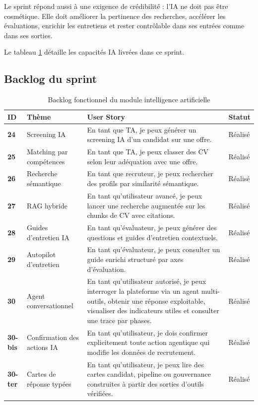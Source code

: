 Le sprint répond aussi à une exigence de crédibilité : l'IA ne doit pas être cosmétique. Elle doit améliorer la pertinence des recherches, accélérer les évaluations, enrichir les entretiens et rester contrôlable dans ses entrées comme dans ses sorties.

Le tableau \ref{tab:ai-backlog} détaille les capacités IA livrées dans ce sprint.
\subsection{Backlog du sprint}
\begin{table}[H]
  \centering
  \caption{\label{tab:ai-backlog}Backlog fonctionnel du module intelligence artificielle}
  \begin{tabularx}{\textwidth}{>{\bfseries}p{1.3cm}p{3.2cm}X>{\raggedright\arraybackslash}p{2cm}}
    \toprule
    ID & Thème & User Story & Statut \\
    \midrule
    24 & Screening IA & En tant que TA, je peux générer un screening IA d'un candidat sur une offre. & Réalisé \\
    25 & Matching par compétences & En tant que TA, je peux classer des CV selon leur adéquation avec une offre. & Réalisé \\
    26 & Recherche sémantique & En tant que recruteur, je peux rechercher des profils par similarité sémantique. & Réalisé \\
    27 & RAG hybride & En tant qu'utilisateur avancé, je peux lancer une recherche augmentée sur les chunks de CV avec citations. & Réalisé \\
    28 & Guides d'entretien IA & En tant qu'évaluateur, je peux générer des questions et guides d'entretien contextuels. & Réalisé \\
    29 & Autopilot d'entretien & En tant qu'évaluateur, je peux consulter un guide enrichi structuré par axes d'évaluation. & Réalisé \\
    30 & Agent conversationnel & En tant qu'utilisateur autorisé, je peux interroger la plateforme via un agent multi-outils, obtenir une réponse exploitable, visualiser des indicateurs utiles et consulter une trace par phases. & Réalisé \\
    30-bis & Confirmation des actions IA & En tant qu'utilisateur, je dois confirmer explicitement toute action agentique qui modifie les données de recrutement. & Réalisé \\
    30-ter & Cartes de réponse typées & En tant qu'utilisateur, je peux lire des cartes candidat, pipeline ou gouvernance construites à partir des sorties d'outils vérifiées. & Réalisé \\

\end{tabularx}
\end{table}

